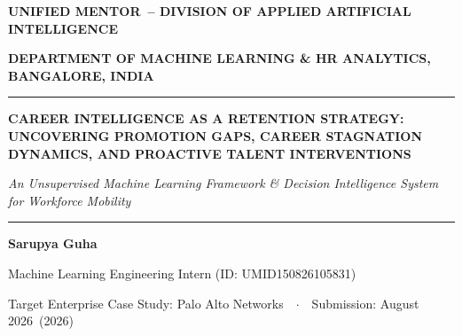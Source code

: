 \documentclass[12pt,a4paper,oneside]{article}
\newcommand{\PaperTitle}{CAREER INTELLIGENCE AS A RETENTION STRATEGY: UNCOVERING PROMOTION GAPS, CAREER STAGNATION DYNAMICS, AND PROACTIVE TALENT INTERVENTIONS}
\newcommand{\PaperSubtitle}{An Unsupervised Machine Learning Framework \& Decision Intelligence System for Workforce Mobility}
\newcommand{\AuthorName}{Sarupya Guha}
\newcommand{\InternID}{UMID150826105831}
\newcommand{\UniversityName}{Unified Mentor}
\newcommand{\CollegeName}{Division of Applied Artificial Intelligence}
\newcommand{\DepartmentName}{Department of Machine Learning \& HR Analytics}
\newcommand{\CollegeLocation}{Bangalore, India}
\newcommand{\AcademicYear}{2026}
\newcommand{\SubmissionDate}{August 2026}
\newcommand{\TargetEnterprise}{Palo Alto Networks}
\begin{document}
\begin{center}
{\fontsize{10}{12}\selectfont\bfseries\uppercase{\UniversityName\ -- \CollegeName}\par}
{\fontsize{9}{11}\selectfont\bfseries\uppercase{\DepartmentName, \CollegeLocation}\par}

\vspace{0.05in}
\rule{\textwidth}{1.2pt}
\vspace{0.05in}

{\fontsize{15}{18}\selectfont\bfseries\uppercase{\PaperTitle}\par}

\vspace{0.04in}
{\fontsize{11}{13}\selectfont\itshape \PaperSubtitle\par}

\vspace{0.05in}
\rule{\textwidth}{0.8pt}
\vspace{0.05in}

{\fontsize{11}{13}\selectfont\bfseries \AuthorName\par}
{\fontsize{9}{11}\selectfont Machine Learning Engineering Intern (ID: \InternID)\par}
{\fontsize{9}{11}\selectfont Target Enterprise Case Study: \TargetEnterprise\ \ $\cdot$\ \ Submission: \SubmissionDate\ (\AcademicYear)\par}

\vspace{0.05in}
\end{center}
\end{document}

